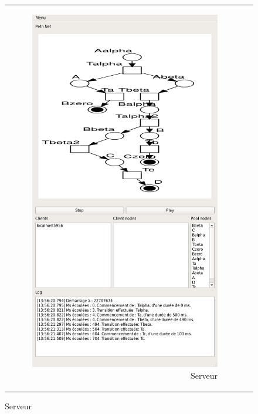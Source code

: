 	
	\begin{figure}
		\centering
		\begin{tabular}{rl}
		\begin{subfigure}{0.5\textwidth}
			\centering
			\includegraphics[scale=0.45]{images/resultats/server_algo_wifi.png}
			\caption{Serveur}
		\end{subfigure}

\end{tabular}
\end{figure}
